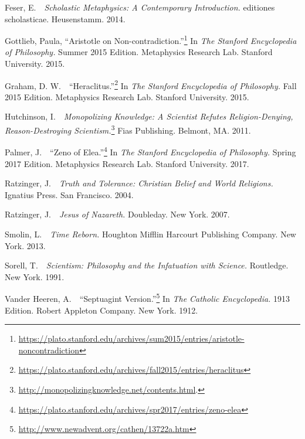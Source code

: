 \documentclass[twocolumn]{article}
\begin{document}
\begin{thebibliography}{}
\begin{small}
      Feser, E.\ \ {\it Scholastic Metaphysics: A Contemporary Introduction.}
      editiones scholasticae.  Heusenstamm.  2014.

      Gottlieb, Paula, ``Aristotle on Non-contradiction.''\footnote{%
         \url{https://plato.stanford.edu/archives/sum2015/entries/aristotle-noncontradiction}%
      }
      In {\it The Stanford Encyclopedia of Philosophy.}  Summer 2015 Edition.
      Metaphysics Research Lab.  Stanford University.  2015.

      Graham, D. W.\ \ ``Heraclitus.''\footnote{%
         \url{https://plato.stanford.edu/archives/fall2015/entries/heraclitus}
      }
      In {\it The Stanford Encyclopedia of Philosophy.}  Fall 2015 Edition.
      Metaphysics Research Lab.  Stanford University.  2015.

      Hutchinson, I.\ \ {\it Monopolizing Knowledge: A Scientist Refutes
      Religion-Denying, Reason-Destroying Scientism.}\footnote{%
         \url{http://monopolizingknowledge.net/contents.html}.%
      }
      Fias Publishing.  Belmont, MA.  2011.

      Palmer, J.\ \ ``Zeno of Elea.''\footnote{%
         \url{https://plato.stanford.edu/archives/spr2017/entries/zeno-elea}%
      }
      In {\it The Stanford Encyclopedia of Philosophy.}  Spring 2017 Edition.
      Metaphysics Research Lab.  Stanford University.  2017.

      Ratzinger, J.\ \ {\it Truth and Tolerance: Christian Belief and World
      Religions.}  Ignatius Press.  San Francisco.  2004.

      Ratzinger, J.\ \ {\it Jesus of Nazareth.}  Doubleday.  New York.  2007.

      Smolin, L.\ \ {\it Time Reborn.}  Houghton Mifflin Harcourt Publishing
      Company.  New York.  2013.

      Sorell, T.\ \ {\it Scientism: Philosophy and the Infatuation with
      Science.}  Routledge.  New York.  1991.

      Vander Heeren, A.\ \ ``Septuagint Version.''\footnote{%
         \url{http://www.newadvent.org/cathen/13722a.htm}%
      }
      In {\it The Catholic Encyclopedia.}  1913 Edition.  Robert Appleton
      Company.  New York.  1912.

   \end{small}

\end{thebibliography}


\end{document}
